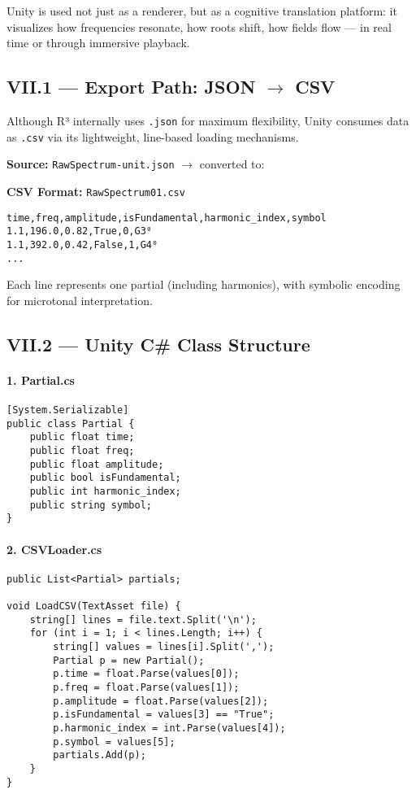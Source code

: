 Unity is used not just as a renderer, but as a cognitive translation platform: it visualizes how frequencies resonate, how roots shift, how fields flow — in real time or through immersive playback.

\subsection*{VII.1 — Export Path: JSON $\rightarrow$ CSV}

Although R³ internally uses \texttt{.json} for maximum flexibility, Unity consumes data as \texttt{.csv} via its lightweight, line-based loading mechanisms.

\textbf{Source:} \texttt{RawSpectrum-unit.json} $\rightarrow$ converted to:

\textbf{CSV Format:} \texttt{RawSpectrum01.csv}

\begin{verbatim}
time,freq,amplitude,isFundamental,harmonic_index,symbol
1.1,196.0,0.82,True,0,G3⁰
1.1,392.0,0.42,False,1,G4⁰
...
\end{verbatim}

Each line represents one partial (including harmonics), with symbolic encoding for microtonal interpretation.

\subsection*{VII.2 — Unity C\# Class Structure}

\paragraph{1. Partial.cs}

\begin{verbatim}
[System.Serializable]
public class Partial {
    public float time;
    public float freq;
    public float amplitude;
    public bool isFundamental;
    public int harmonic_index;
    public string symbol;
}
\end{verbatim}

\paragraph{2. CSVLoader.cs}

\begin{verbatim}
public List<Partial> partials;

void LoadCSV(TextAsset file) {
    string[] lines = file.text.Split('\n');
    for (int i = 1; i < lines.Length; i++) {
        string[] values = lines[i].Split(',');
        Partial p = new Partial();
        p.time = float.Parse(values[0]);
        p.freq = float.Parse(values[1]);
        p.amplitude = float.Parse(values[2]);
        p.isFundamental = values[3] == "True";
        p.harmonic_index = int.Parse(values[4]);
        p.symbol = values[5];
        partials.Add(p);
    }
}
\end{verbatim}

